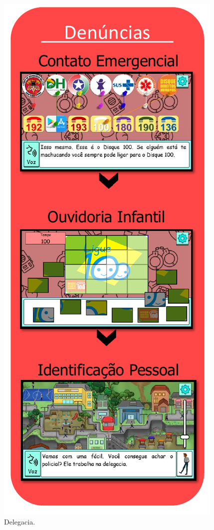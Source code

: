 \begin{figure}%
  \vspace{-20pt}
  \caption{\label{fig:DelegaciaDP}Delegacia.}
  \includegraphics[width=\linewidth]{./Visuais/Delegacia2.pdf}
  \vspace{-1.0cm}
\end{figure}


